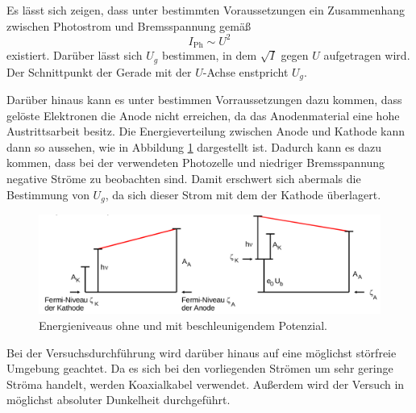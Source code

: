 Es lässt sich zeigen, dass unter bestimmten Voraussetzungen ein Zusammenhang zwischen Photostrom und Bremsspannung gemäß
\begin{equation}
    I_{\text{Ph}}\sim U^2
\end{equation}
existiert.
Darüber lässt sich $U_g$ bestimmen, in dem $\sqrt{I}$ gegen $U$ aufgetragen wird. Der Schnittpunkt der Gerade mit der $U$-Achse enstpricht $U_g$.

Darüber hinaus kann es unter bestimmen Vorraussetzungen dazu kommen, dass gelöste Elektronen die Anode nicht erreichen, da das Anodenmaterial eine hohe Austrittsarbeit besitz. Die Energieverteilung zwischen Anode und Kathode kann dann so aussehen, wie in Abbildung \ref{fig:Energie} dargestellt ist.
Dadurch kann es dazu kommen, dass bei der verwendeten Photozelle und niedriger Bremsspannung negative Ströme zu beobachten sind. Damit erschwert sich abermals die Bestimmung von $U_g$, da sich dieser Strom mit dem der Kathode überlagert.

\begin{figure}
\centering
\includegraphics[width=\textwidth]{data/Energie.png}
\caption{Energieniveaus ohne und mit beschleunigendem Potenzial.}
\label{fig:Energie}
\end{figure}


Bei der Versuchsdurchführung wird darüber hinaus auf eine möglichst störfreie Umgebung geachtet. Da es sich bei den vorliegenden Strömen um sehr geringe Ströma handelt, werden Koaxialkabel verwendet. Außerdem wird der Versuch in möglichst absoluter Dunkelheit durchgeführt.














